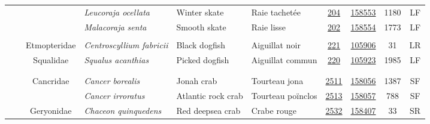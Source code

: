 \documentclass[12pt]{article}\usepackage[]{graphicx}\usepackage[]{color}
\begin{document}
\begin{landscapepage}
\begin{longtable}[t]{ccc>{\centering\arraybackslash}p{3cm}>{\centering\arraybackslash}p{3cm}>{\centering\arraybackslash}p{3cm}>{}c>{}ccc}
\hspace{1em}\hspace{1em} &  &  & \em{Leucoraja ocellata} & Winter skate & Raie tachetée & \href{#sec:203}{204} & \href{http://www.marinespecies.org/aphia.php?p=taxdetails&id=158551}{158553} & 1180 & LF\\
\hspace{1em}\hspace{1em} &  &  & \em{Malacoraja senta} & Smooth skate & Raie lisse & \href{#sec:204}{202} & \href{http://www.marinespecies.org/aphia.php?p=taxdetails&id=158553}{158554} & 1773 & LF\\
\addlinespace[0.3em]
\\
\hspace{1em}\hspace{1em} &  & Etmopteridae & \em{Centroscyllium fabricii} & Black dogfish & Aiguillat noir & \href{#sec:220}{221} & \href{http://www.marinespecies.org/aphia.php?p=taxdetails&id=105923}{105906} & 31 & LR\\
\hspace{1em}\hspace{1em} &  & Squalidae & \em{Squalus acanthias} & Picked dogfish & Aiguillat commun & \href{#sec:221}{220} & \href{http://www.marinespecies.org/aphia.php?p=taxdetails&id=105906}{105923} & 1985 & LF\\
\addlinespace[0.3em]
\\
\addlinespace[0.3em]
\\
\hspace{1em}\hspace{1em} &  & Cancridae & \em{Cancer borealis} & Jonah crab & Tourteau jona & \href{#sec:4511}{2511} & \href{http://www.marinespecies.org/aphia.php?p=taxdetails&id=153087}{158056} & 1387 & SF\\
\hspace{1em}\hspace{1em} &  &  & \em{Cancer irroratus} & Atlantic rock crab & Tourteau poïnclos & \href{#sec:4512}{2513} & \href{http://www.marinespecies.org/aphia.php?p=taxdetails&id=574541}{158057} & 788 & SF\\
\hspace{1em}\hspace{1em} &  & Geryonidae & \em{Chaceon quinquedens} & Red deepsea crab & Crabe rouge & \href{#sec:2211}{2532} & \href{http://www.marinespecies.org/aphia.php?p=taxdetails&id=107649}{158407} & 33 & SR\\

\end{longtable}
\end{landscapepage}
\end{document}

